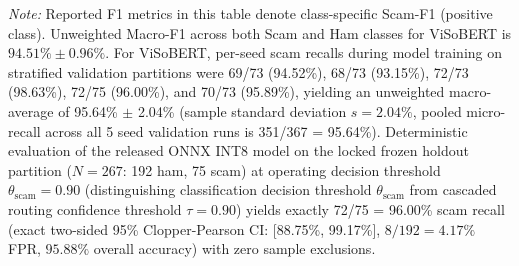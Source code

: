 \documentclass[journal]{IEEEtran}
\begin{document}
\begin{table}[t]
\centering
\caption{Multi-Seed Validation Performance across 5 Independent Training Runs ($K=5$) and Released INT8 Model Benchmark on Locked Frozen Holdout ($N=267$)}
\label{tab:benchmark_summary}
\par\vspace{6pt}
\parbox{\textwidth}{\footnotesize \textit{Note:} Reported F1 metrics in this table denote class-specific Scam-F1 (positive class). Unweighted Macro-F1 across both Scam and Ham classes for ViSoBERT is $94.51\% \pm 0.96\%$. For ViSoBERT, per-seed scam recalls during model training on stratified validation partitions were 69/73 (94.52\%), 68/73 (93.15\%), 72/73 (98.63\%), 72/75 (96.00\%), and 70/73 (95.89\%), yielding an unweighted macro-average of 95.64\% $\pm$ 2.04\% (sample standard deviation $s=2.04\%$, pooled micro-recall across all 5 seed validation runs is 351/367 = 95.64\%). Deterministic evaluation of the released ONNX INT8 model on the locked frozen holdout partition ($N=267$: 192 ham, 75 scam) at operating decision threshold $\theta_{\text{scam}}=0.90$ (distinguishing classification decision threshold $\theta_{\text{scam}}$ from cascaded routing confidence threshold $\tau = 0.90$) yields exactly 72/75 = 96.00\% scam recall (exact two-sided 95\% Clopper-Pearson CI: [88.75\%, 99.17\%], $8/192 = 4.17\%$ FPR, $95.88\%$ overall accuracy) with zero sample exclusions.}
\end{table}
\end{document}
